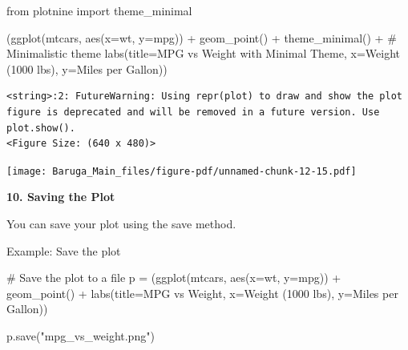 \documentclass[
  letterpaper,
  DIV=11,
  numbers=noendperiod]{scrreprt}
\newenvironment{Shaded}{\begin{snugshade}}{\end{snugshade}}
\newcommand{\CommentTok}[1]{\textcolor[rgb]{0.37,0.37,0.37}{#1}}
\newcommand{\ImportTok}[1]{\textcolor[rgb]{0.00,0.46,0.62}{#1}}
\newcommand{\NormalTok}[1]{\textcolor[rgb]{0.00,0.23,0.31}{#1}}
\newcommand{\OperatorTok}[1]{\textcolor[rgb]{0.37,0.37,0.37}{#1}}
\newcommand{\StringTok}[1]{\textcolor[rgb]{0.13,0.47,0.30}{#1}}
\begin{document}
\begin{Shaded}
\begin{Highlighting}[]
\ImportTok{from}\NormalTok{ plotnine }\ImportTok{import}\NormalTok{ theme\_minimal}

\NormalTok{(ggplot(mtcars, aes(x}\OperatorTok{=}\StringTok{\textquotesingle{}wt\textquotesingle{}}\NormalTok{, y}\OperatorTok{=}\StringTok{\textquotesingle{}mpg\textquotesingle{}}\NormalTok{)) }\OperatorTok{+}
\NormalTok{ geom\_point() }\OperatorTok{+}
\NormalTok{ theme\_minimal() }\OperatorTok{+}  \CommentTok{\# Minimalistic theme}
\NormalTok{ labs(title}\OperatorTok{=}\StringTok{\textquotesingle{}MPG vs Weight with Minimal Theme\textquotesingle{}}\NormalTok{,}
\NormalTok{      x}\OperatorTok{=}\StringTok{\textquotesingle{}Weight (1000 lbs)\textquotesingle{}}\NormalTok{,}
\NormalTok{      y}\OperatorTok{=}\StringTok{\textquotesingle{}Miles per Gallon\textquotesingle{}}\NormalTok{))}
\end{Highlighting}
\end{Shaded}

\begin{verbatim}
<string>:2: FutureWarning: Using repr(plot) to draw and show the plot figure is deprecated and will be removed in a future version. Use plot.show().
<Figure Size: (640 x 480)>
\end{verbatim}

\texttt{[image: Baruga\_Main\_files/figure-pdf/unnamed-chunk-12-15.pdf]}

\textbf{10. Saving the Plot}

You can save your plot using the save method.

Example: Save the plot

\begin{Shaded}
\begin{Highlighting}[]
\CommentTok{\# Save the plot to a file}
\NormalTok{p }\OperatorTok{=}\NormalTok{ (ggplot(mtcars, aes(x}\OperatorTok{=}\StringTok{\textquotesingle{}wt\textquotesingle{}}\NormalTok{, y}\OperatorTok{=}\StringTok{\textquotesingle{}mpg\textquotesingle{}}\NormalTok{)) }\OperatorTok{+}
\NormalTok{     geom\_point() }\OperatorTok{+}
\NormalTok{     labs(title}\OperatorTok{=}\StringTok{\textquotesingle{}MPG vs Weight\textquotesingle{}}\NormalTok{,}
\NormalTok{          x}\OperatorTok{=}\StringTok{\textquotesingle{}Weight (1000 lbs)\textquotesingle{}}\NormalTok{,}
\NormalTok{          y}\OperatorTok{=}\StringTok{\textquotesingle{}Miles per Gallon\textquotesingle{}}\NormalTok{))}

\NormalTok{p.save(}\StringTok{"mpg\_vs\_weight.png"}\NormalTok{)}
\end{Highlighting}
\end{Shaded}
\end{document}
